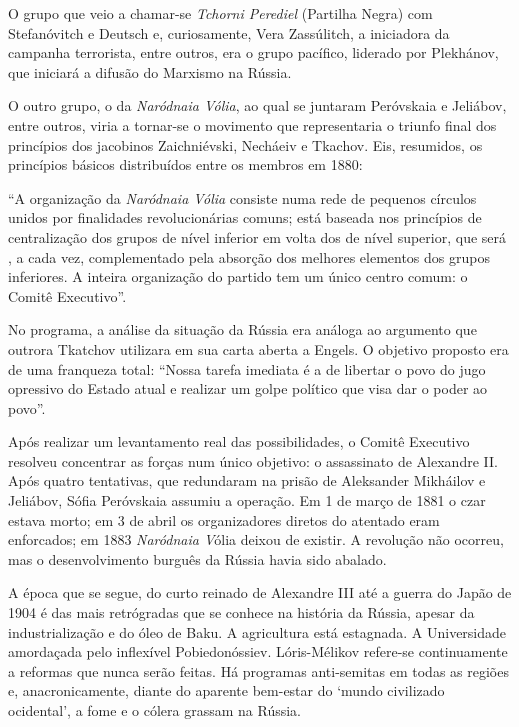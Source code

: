 O grupo que veio a chamar-se \emph{Tchorni Perediel} (Partilha Negra)
com Stefanóvitch e Deutsch e, curiosamente, Vera Zassúlitch, a
iniciadora da campanha terrorista, entre outros, era o grupo pacífico,
liderado por Plekhánov, que iniciará a difusão do Marxismo na Rússia.

O outro grupo, o da \emph{Naródnaia Vólia}, ao qual se juntaram
Peróvskaia e Jeliábov, entre outros, viria a tornar-se o movimento que
representaria o triunfo final dos princípios dos jacobinos Zaichniévski,
Necháeiv e Tkachov. Eis, resumidos, os princípios básicos distribuídos
entre os membros em 1880:

``A organização da \emph{Naródnaia Vólia} consiste numa rede de pequenos
círculos unidos por finalidades revolucionárias comuns; está baseada nos
princípios de centralização dos grupos de nível inferior em volta dos de
nível superior, que será , a cada vez, complementado pela absorção dos
melhores elementos dos grupos inferiores. A inteira organização do
partido tem um único centro comum: o Comitê Executivo''.

No programa, a análise da situação da Rússia era análoga ao argumento
que outrora Tkatchov utilizara em sua carta aberta a Engels. O objetivo
proposto era de uma franqueza total: ``Nossa tarefa imediata é a de
libertar o povo do jugo opressivo do Estado atual e realizar um golpe
político que visa dar o poder ao povo''.

Após realizar um levantamento real das possibilidades, o Comitê
Executivo resolveu concentrar as forças num único objetivo: o
assassinato de Alexandre II. Após quatro tentativas, que redundaram na
prisão de Aleksander Mikháilov e Jeliábov, Sófia Peróvskaia assumiu a
operação. Em 1 de março de 1881 o czar estava morto; em 3 de abril os
organizadores diretos do atentado eram enforcados; em 1883
\emph{Naródnaia V}ólia deixou de existir. A revolução não ocorreu, mas o
desenvolvimento burguês da Rússia havia sido abalado.

A época que se segue, do curto reinado de Alexandre III até a guerra do
Japão de 1904 é das mais retrógradas que se conhece na história da
Rússia, apesar da industrialização e do óleo de Baku. A agricultura está
estagnada. A Universidade amordaçada pelo inflexível Pobiedonóssiev.
Lóris-Mélikov refere-se continuamente a reformas que nunca serão feitas.
Há programas anti-semitas em todas as regiões e, anacronicamente, diante
do aparente bem-estar do `mundo civilizado ocidental', a fome e o cólera
grassam na Rússia.

